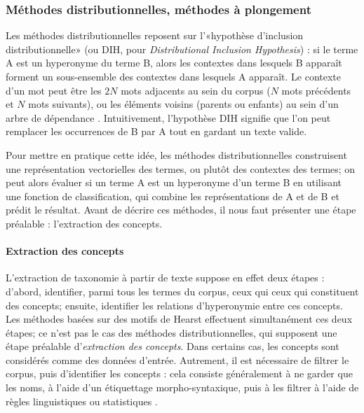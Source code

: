 
\subsubsection{Méthodes distributionnelles, méthodes à plongement}

Les méthodes distributionnelles reposent sur l'«hypothèse d'inclusion distributionnelle» (ou DIH, pour \textit{Distributional Inclusion Hypothesis}) \cite{geffet2005distributional} : si le terme A est un hyperonyme du terme B, alors les contextes dans lesquels B apparaît forment un sous-ensemble des contextes dans lesquels A apparaît. Le contexte d'un mot peut être les $2N$ mots adjacents au sein du corpus ($N$ mots précédents et $N$ mots suivants), ou les éléments voisins (parents ou enfants) au sein d'un arbre de dépendance \cite{shwartz-etal-2017-hypernyms}.
Intuitivement, l'hypothèse DIH signifie que l'on peut remplacer les occurrences de B par A tout en gardant un texte valide.

Pour mettre en pratique cette idée, les méthodes distributionnelles construisent une représentation vectorielles des termes, ou plutôt des contextes des termes; on peut alors évaluer si un terme A est un hyperonyme d'un terme B en utilisant une fonction de classification, qui combine les représentations de A et de B et prédit le résultat. Avant de décrire ces méthodes, il nous faut présenter une étape préalable : l'extraction des concepts.


\paragraph{Extraction des concepts}

L'extraction de taxonomie à partir de texte suppose en effet deux étapes : d'abord, identifier, parmi tous les termes du corpus, ceux qui ceux qui constituent des concepts; ensuite, identifier les relations d'hyperonymie entre ces concepts. Les méthodes basées sur des motifs de Hearst effectuent simultanément ces deux étapes; ce n'est pas le cas des méthodes distributionnelles, qui supposent une étape préalable d'\textit{extraction des concepts}. Dans certains cas, les concepts sont considérés comme des données d'entrée. %
Autrement, il est nécessaire de filtrer le corpus, puis d'identifier les concepts : cela consiste généralement à ne garder que les noms, à l'aide d'un étiquettage morpho-syntaxique, puis à les filtrer à l'aide de règles linguistiques ou statistiques \cite{shang2018automated}. %

